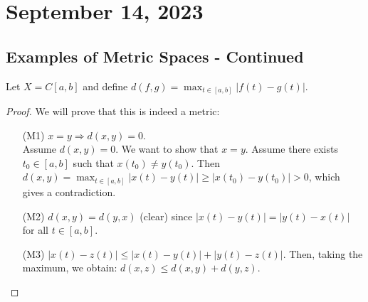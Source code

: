 \newpage
\section{September 14, 2023}
\subsection{Examples of Metric Spaces  - Continued }
\begin{example}
    Let $X = C[a,b]$ and define $d(f,g) = \max_{t \in [a,b]} |f(t) - g(t)|$.
\end{example}

\begin{proof}
We will prove that this is indeed a metric:
\begin{itemize}
  \item[(M1)] $x = y \Rightarrow d(x,y) = 0$. \\
  Assume $d(x,y) = 0$. We want to show that $x = y$. Assume there exists $t_0 \in [a,b]$ such that $x(t_0) \neq y(t_0)$. Then $d(x,y) = \max_{t \in [a,b]} |x(t) - y(t)| \geq |x(t_0) - y(t_0)| > 0$, which gives a contradiction.
  
  \item[(M2)] $d(x,y) = d(y,x)$ (clear) since $|x(t) - y(t)| = |y(t) - x(t)|$ for all $t \in [a,b]$.
  
  \item[(M3)] $|x(t) - z(t)| \leq |x(t) - y(t)| + |y(t) - z(t)|$. Then, taking the maximum, we obtain: $d(x,z) \leq d(x,y) + d(y,z)$.
  \end{itemize}
\end{proof}


